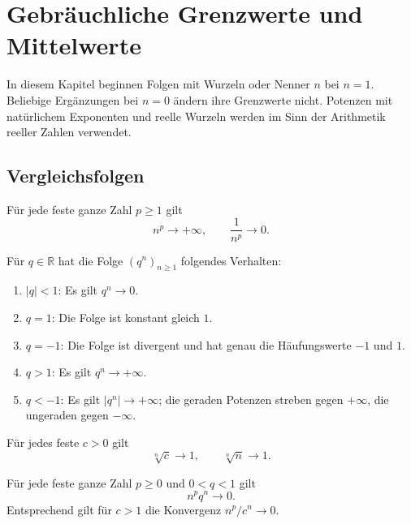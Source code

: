 \chapter{Gebräuchliche Grenzwerte und Mittelwerte}
\label{b21guide:ch:standard}

In diesem Kapitel beginnen Folgen mit Wurzeln oder Nenner $n$
bei $n=1$. Beliebige Ergänzungen bei $n=0$ ändern ihre Grenzwerte
nicht. Potenzen mit natürlichem Exponenten und reelle Wurzeln
werden im Sinn der Arithmetik reeller Zahlen verwendet.

\section{Vergleichsfolgen}

\begin{theorem}
Für jede feste ganze Zahl $p\geq1$ gilt
\[
 n^p\to+\infty,\qquad \frac1{n^p}\to0.
\]
\end{theorem}

\begin{theorem}
\label{b21guide:thm:geometric}
Für $q\in\mathbb R$ hat die Folge $(q^n)_{n\geq1}$
folgendes Verhalten:
\begin{enumerate}
 \item $|q|<1$: Es gilt $q^n\to0$.
 \item $q=1$: Die Folge ist konstant gleich $1$.
 \item $q=-1$: Die Folge ist divergent und hat genau die
 Häufungswerte $-1$ und $1$.
 \item $q>1$: Es gilt $q^n\to+\infty$.
 \item $q<-1$: Es gilt $|q^n|\to+\infty$; die geraden
 Potenzen streben gegen $+\infty$, die ungeraden gegen $-\infty$.
\end{enumerate}
\end{theorem}

\begin{theorem}
\label{b21guide:thm:nth-roots}
Für jedes feste $c>0$ gilt
\[
 \sqrt[n]{c}\to1,\qquad \sqrt[n]{n}\to1.
\]
\end{theorem}

\begin{theorem}
Für jede feste ganze Zahl $p\geq0$ und $0<q<1$ gilt
\[
 n^p q^n\to0.
\]
Entsprechend gilt für $c>1$ die Konvergenz $n^p/c^n\to0$.
\end{theorem}

